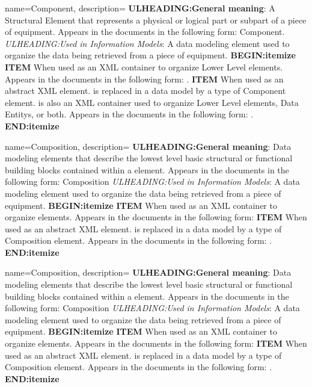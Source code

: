 {
    name={Component},
	description={
  \textbf{ULHEADING:General meaning}:
  A \gls{Structural Element} that represents a physical or logical part or subpart of a piece of equipment.
  Appears in the documents in the following form: \gls{Component}.
  \textit{ULHEADING:Used in \gls{Information Models}}:
  A data modeling element used to organize the data being retrieved from a piece of equipment.
  \textbf{BEGIN:itemize}
      \textbf{ITEM} When used as an XML container to organize \gls{Lower Level}  elements. 
      Appears in the documents in the following form: .
      \textbf{ITEM} When used as an abstract XML element.  is replaced in a data model by a type of \gls{Component} element.  is also an XML container used to organize \gls{Lower Level}  elements, \glspl{Data Entity}, or both.
      Appears in the documents in the following form: .
  \textbf{END:itemize}
}
}

{
    name={Composition},
	description={
  \textbf{ULHEADING:General meaning}:
  Data modeling elements that describe the lowest level basic structural or functional building blocks contained within a  element.
  Appears in the documents in the following form: \gls{Composition}
  \textit{ULHEADING:Used in \gls{Information Models}}:
  A data modeling element used to organize the data being retrieved from a piece of equipment.
  \textbf{BEGIN:itemize}
      \textbf{ITEM} When used as an XML container to organize  elements. 
      Appears in the documents in the following form: 
      \textbf{ITEM} When used as an abstract XML element.  is replaced in a data model by a type of \gls{Composition} element. 
      Appears in the documents in the following form: .
  \textbf{END:itemize}
}
}

{
    name={Composition},
	description={
  \textbf{ULHEADING:General meaning}:
  Data modeling elements that describe the lowest level basic structural or functional building blocks contained within a  element.
  Appears in the documents in the following form: \gls{Composition}
  \textit{ULHEADING:Used in \gls{Information Models}}:
  A data modeling element used to organize the data being retrieved from a piece of equipment.
  \textbf{BEGIN:itemize}
      \textbf{ITEM} When used as an XML container to organize  elements. 
      Appears in the documents in the following form: 
      \textbf{ITEM} When used as an abstract XML element.  is replaced in a data model by a type of \gls{Composition} element. 
      Appears in the documents in the following form: .
  \textbf{END:itemize}
}
}

